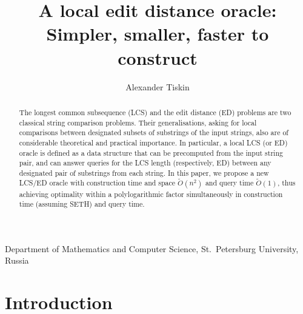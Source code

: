 \documentclass[a4paper,UKenglish,cleveref]{lipics-v2021}
\begin{document}
\title{A local edit distance oracle: Simpler, smaller, faster to construct}


\newcommand{\myabstract}{%
The longest common subsequence (LCS) and the edit distance (ED) problems 
are two classical string comparison problems.
Their generalisations, asking for local comparisons 
between designated subsets of substrings of the input strings,
also are of considerable theoretical and practical importance.
In particular, a local LCS (or ED) oracle is defined as a data structure
that can be precomputed from the input string pair,
and can answer queries for the LCS length (respectively, ED) 
between any designated pair of substrings from each string.
In this paper, we propose a new LCS/ED oracle 
with construction time and space $\tilde O(n^2)$ and query time $\tilde O(1)$,
thus achieving optimality within a polylogarithmic factor 
simultaneously in construction time (assuming SETH) and query time.
}

\author{Alexander Tiskin}{Department of Mathematics and Computer Science, 
St.~Petersburg University, 
Russia}{}{}{}




\maketitle

\begin{abstract}
\myabstract
\end{abstract}



\section{Introduction}
\end{document}
